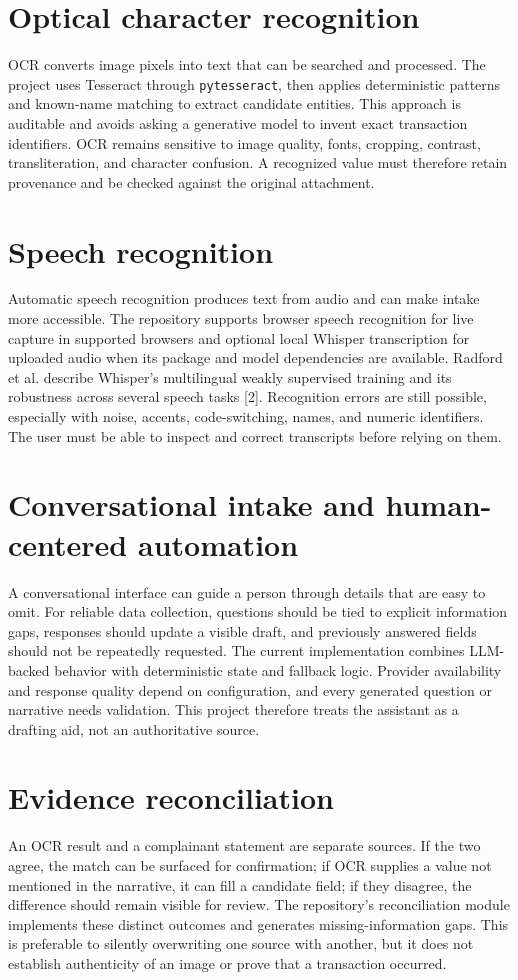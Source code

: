 \documentclass[12pt,a4paper,oneside]{report}
\begin{document}
\section{Optical character recognition}
OCR converts image pixels into text that can be searched and processed. The project uses Tesseract through \texttt{pytesseract}, then applies deterministic patterns and known-name matching to extract candidate entities. This approach is auditable and avoids asking a generative model to invent exact transaction identifiers. OCR remains sensitive to image quality, fonts, cropping, contrast, transliteration, and character confusion. A recognized value must therefore retain provenance and be checked against the original attachment.\par\medskip
\section{Speech recognition}
Automatic speech recognition produces text from audio and can make intake more accessible. The repository supports browser speech recognition for live capture in supported browsers and optional local Whisper transcription for uploaded audio when its package and model dependencies are available. Radford et al. describe Whisper's multilingual weakly supervised training and its robustness across several speech tasks [2]. Recognition errors are still possible, especially with noise, accents, code-switching, names, and numeric identifiers. The user must be able to inspect and correct transcripts before relying on them.\par\medskip
\section{Conversational intake and human-centered automation}
A conversational interface can guide a person through details that are easy to omit. For reliable data collection, questions should be tied to explicit information gaps, responses should update a visible draft, and previously answered fields should not be repeatedly requested. The current implementation combines LLM-backed behavior with deterministic state and fallback logic. Provider availability and response quality depend on configuration, and every generated question or narrative needs validation. This project therefore treats the assistant as a drafting aid, not an authoritative source.\par\medskip
\section{Evidence reconciliation}
An OCR result and a complainant statement are separate sources. If the two agree, the match can be surfaced for confirmation; if OCR supplies a value not mentioned in the narrative, it can fill a candidate field; if they disagree, the difference should remain visible for review. The repository's reconciliation module implements these distinct outcomes and generates missing-information gaps. This is preferable to silently overwriting one source with another, but it does not establish authenticity of an image or prove that a transaction occurred.\par\medskip
\end{document}
